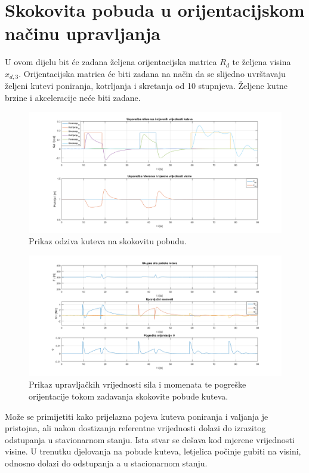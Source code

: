 \documentclass[times, utf8, diplomski]{fer}
\begin{document}
	\section{Skokovita pobuda u orijentacijskom načinu upravljanja}
	U ovom dijelu bit će zadana željena orijentacijska matrica $R_d$ te željena visina $x_{d,3}$. Orijentacijska matrica će biti zadana na način da se slijedno uvrštavaju željeni kutevi poniranja, kotrljanja i skretanja od 10 stupnjeva. Željene kutne brzine i akceleracije neće biti zadane. 
	\begin{figure}[h!]
		\includegraphics[width=\textwidth]{plots/orientation_euler.png}
		\caption{Prikaz odziva kuteva na skokovitu pobudu.}
	\end{figure}
	
	\newpage
	\clearpage
	
	\begin{figure}[h!]
		\includegraphics[width=\textwidth]{plots/orientation_forces_moments.png}
		\caption{Prikaz upravljačkih vrijednosti sila i momenata te pogreške orijentacije tokom zadavanja skokovite pobude kuteva.}
	\end{figure}
	Može se primijetiti kako prijelazna pojeva kuteva poniranja i valjanja je pristojna, ali nakon dostizanja referentne vrijednosti dolazi do izrazitog odstupanja u stavionarnom stanju. Ista stvar se dešava kod mjerene vrijednosti visine. U trenutku djelovanja na pobude kuteva, letjelica počinje gubiti na visini, odnosno dolazi do odstupanja a u stacionarnom stanju.
	
\end{document}
